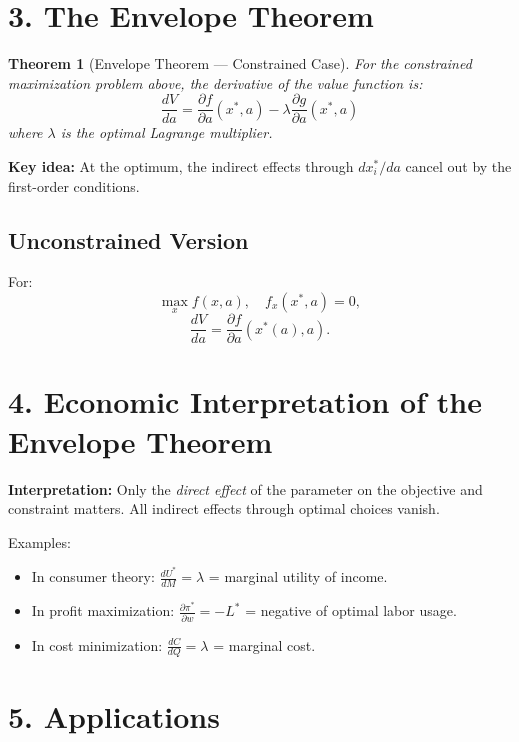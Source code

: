 \documentclass[12pt]{article}
\newtheorem{theorem}{Theorem}
\begin{document}
\section*{3. The Envelope Theorem}

\begin{theorem}[Envelope Theorem — Constrained Case]
For the constrained maximization problem above, the derivative of the value function is:
\[
\boxed{
\frac{dV}{da} = 
\frac{\partial f}{\partial a}(x^*,a)
-
\lambda \frac{\partial g}{\partial a}(x^*,a)
}
\]
where $\lambda$ is the optimal Lagrange multiplier.
\end{theorem}

\textbf{Key idea:} At the optimum, the indirect effects through $dx_i^*/da$ cancel out by the first-order conditions.

\subsection*{Unconstrained Version}
For:
\[
\max_x f(x,a),
\quad f_x(x^*,a)=0,
\]
\[
\boxed{
\frac{dV}{da}
=
\frac{\partial f}{\partial a}(x^*(a),a).
}
\]

\section*{4. Economic Interpretation of the Envelope Theorem}

\begin{tcolorbox}
\textbf{Interpretation:} 
Only the \textit{direct effect} of the parameter on the objective and constraint matters.  
All indirect effects through optimal choices vanish.
\end{tcolorbox}

Examples:
\begin{itemize}
\item In consumer theory: $\displaystyle \frac{dU^*}{dM}=\lambda$ = marginal utility of income.
\item In profit maximization: $\displaystyle \frac{\partial \pi^*}{\partial w}=-L^*$ = negative of optimal labor usage.
\item In cost minimization: $\displaystyle \frac{dC}{dQ}=\lambda$ = marginal cost.
\end{itemize}

\section*{5. Applications}
\end{document}
